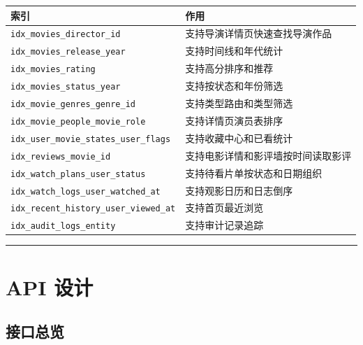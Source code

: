 \documentclass[
]{ctexart}
\begin{document}
\begin{longtable}[]{@{}ll@{}}
\toprule
索引 & 作用 \\
\midrule
\endhead
\texttt{idx\_movies\_director\_id} & 支持导演详情页快速查找导演作品 \\
\texttt{idx\_movies\_release\_year} & 支持时间线和年代统计 \\
\texttt{idx\_movies\_rating} & 支持高分排序和推荐 \\
\texttt{idx\_movies\_status\_year} & 支持按状态和年份筛选 \\
\texttt{idx\_movie\_genres\_genre\_id} & 支持类型路由和类型筛选 \\
\texttt{idx\_movie\_people\_movie\_role} & 支持详情页演员表排序 \\
\texttt{idx\_user\_movie\_states\_user\_flags} &
支持收藏中心和已看统计 \\
\texttt{idx\_reviews\_movie\_id} & 支持电影详情和影评墙按时间读取影评 \\
\texttt{idx\_watch\_plans\_user\_status} &
支持待看片单按状态和日期组织 \\
\texttt{idx\_watch\_logs\_user\_watched\_at} & 支持观影日历和日志倒序 \\
\texttt{idx\_recent\_history\_user\_viewed\_at} & 支持首页最近浏览 \\
\texttt{idx\_audit\_logs\_entity} & 支持审计记录追踪 \\
\bottomrule
\end{longtable}

\begin{center}\rule{0.5\linewidth}{0.5pt}\end{center}

\hypertarget{api-ux8bbeux8ba1}{%
\section{API 设计}\label{api-ux8bbeux8ba1}}

\hypertarget{ux63a5ux53e3ux603bux89c8}{%
\subsection{接口总览}\label{ux63a5ux53e3ux603bux89c8}}
\end{document}
